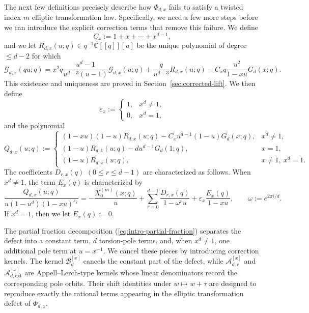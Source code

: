 \documentclass[12pt]{amsart}
\numberwithin{equation}{section}
\newcommand{\CC}{\mathbb C}
\begin{document}
The next few definitions precisely describe how \(\Phi_{d,x}\) fails to satisfy a twisted index \(m\) elliptic transformation law. Specifically, we need a few more steps before we can introduce the explicit correction terms that remove this failure.
We define
\[
C_x:=1+x+\cdots+x^{d-1},
\]
and we let \(R_{d,x}(u;q)\in q^{-1}\CC[[q]][u]\) be the unique polynomial
of degree \(\leq d-2\) for which
\begin{equation}\label{eq:intro-R-defining-equation}
\mathcal G_{d,x}(qu;q)
=
x^2q\frac{u^d-1}{u^{d-3}(u-1)}\mathcal G_{d,x}(u;q)
+
\frac{q}{u^{d-3}}R_{d,x}(u;q)
-
C_xq\frac{u^2}{1-xu}G_d(x;q).
\end{equation}
This existence and uniqueness are proved in Section~\ref{sec:corrected-lift}.
We then define
\[
\varepsilon_x:=
\begin{cases}
1,&x^d\neq1,\\
0,&x^d=1,
\end{cases}
\]
and  the polynomial 
\[
Q_{d,x}(u;q):=
\begin{cases}
(1-xu)(1-u)R_{d,x}(u;q)-C_xu^{d-1}(1-u)G_d(x;q),&x^d\neq1,\\[3pt]
(1-u)R_{d,1}(u;q)-du^{d-1}G_d(1;q),&x=1,\\[3pt]
(1-u)R_{d,x}(u;q),&x\neq1,\ x^d=1.
\end{cases}
\]
The coefficients \(D_{r,x}(q)\) \((0\leq r\leq d-1)\) are characterized as follows.  When
\(x^d\neq1\), the term \(E_x(q)\) is characterized by
\begin{equation}\label{eq:intro-partial-fraction}
\frac{Q_{d,x}(u;q)}{u(1-u^d)(1-xu)^{\varepsilon_x}}
=
-\frac{X_0^{(m)}(x;q)}{u}
+
\sum_{r=0}^{d-1}\frac{D_{r,x}(q)}{1-\omega^ru}
+
\varepsilon_x\frac{E_x(q)}{1-xu},
\qquad
\omega:=e^{2\pi i/d}.
\end{equation}
If \(x^d=1\), then we let \(E_x(q):=0\).  

The partial fraction decomposition (\ref{eq:intro-partial-fraction}) separates the defect into a constant
term, \(d\) torsion-pole terms, and, when \(x^d\neq1\), one additional pole
term at \(u=x^{-1}\).  We cancel these pieces by introducing
correction kernels.  The kernel \(\mathcal B_d^{[x]}\) cancels the constant
part of the defect, while \(\mathcal A_{d,r}^{[x]}\) and
\(\mathcal A_{d,\mathrm{ext}}^{[x]}\) are Appell--Lerch-type kernels whose
linear denominators record the corresponding pole orbits.  Their shift
identities under \(w\mapsto w+\tau\) are designed to reproduce exactly the
rational terms appearing in the elliptic transformation defect of
\(\Phi_{d,x}\).
\end{document}
